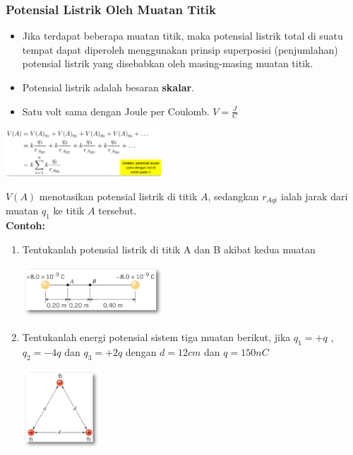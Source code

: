 \documentclass[twocolumn, 11pt]{article}%
\begin{document}
     \subsubsection{Potensial Listrik Oleh Muatan Titik}%
     \begin{itemize}
         \item Jika terdapat beberapa muatan titik, maka potensial listrik total di suatu tempat dapat diperoleh menggunakan prinsip superposisi (penjumlahan) potensial listrik yang disebabkan oleh masing-masing muatan titik.
         \item Potensial listrik adalah besaran \textbf{skalar}.
         \item Satu volt sama dengan Joule per Coulomb. $\displaystyle V=\frac{J}{C}$
     \end{itemize}

     \begin{center}
         \includegraphics[width=220px]{4.png}
     \end{center}

     $V(A)$ menotasikan potensial listrik di titik $A$, sedangkan $r_{Aqi}$ ialah jarak dari muatan $q_1$ ke titik $A$ tersebut.\\

     \textbf{Contoh:}

     \begin{enumerate}
         \item Tentukanlah potensial listrik di titik A dan B akibat kedua muatan
         \begin{center}
            \includegraphics[width=200px]{5.png}
         \end{center}

         \item Tentukanlah energi potensial sistem tiga muatan berikut, jika $q_1=+q$ , $q_2=-4q$ dan $q_3=+2q$ dengan $d=12 cm$ dan $q=150 nC$
             \begin{center}
                    \includegraphics[width=110px]{6.png}
             \end{center}
     \end{enumerate}
\end{document}
